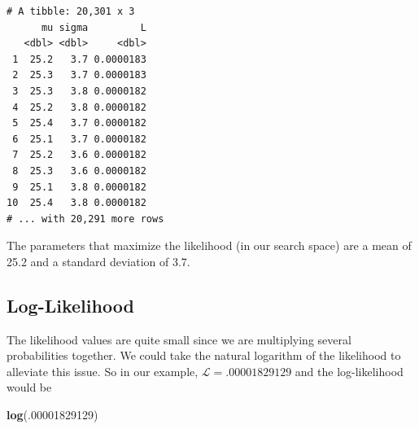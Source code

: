 \documentclass[]{book}
\newenvironment{Shaded}{\begin{snugshade}}{\end{snugshade}}
\newcommand{\DataTypeTok}[1]{\textcolor[rgb]{0.13,0.29,0.53}{#1}}
\newcommand{\DecValTok}[1]{\textcolor[rgb]{0.00,0.00,0.81}{#1}}
\newcommand{\FloatTok}[1]{\textcolor[rgb]{0.00,0.00,0.81}{#1}}
\newcommand{\KeywordTok}[1]{\textcolor[rgb]{0.13,0.29,0.53}{\textbf{#1}}}
\newcommand{\NormalTok}[1]{#1}
\newcommand{\OperatorTok}[1]{\textcolor[rgb]{0.81,0.36,0.00}{\textbf{#1}}}
\newcommand{\StringTok}[1]{\textcolor[rgb]{0.31,0.60,0.02}{#1}}
\begin{document}
\begin{Shaded}
\end{Shaded}

\begin{verbatim}
# A tibble: 20,301 x 3
      mu sigma         L
   <dbl> <dbl>     <dbl>
 1  25.2   3.7 0.0000183
 2  25.3   3.7 0.0000183
 3  25.3   3.8 0.0000182
 4  25.2   3.8 0.0000182
 5  25.4   3.7 0.0000182
 6  25.1   3.7 0.0000182
 7  25.2   3.6 0.0000182
 8  25.3   3.6 0.0000182
 9  25.1   3.8 0.0000182
10  25.4   3.8 0.0000182
# ... with 20,291 more rows
\end{verbatim}

The parameters that maximize the likelihood (in our search space) are a mean of 25.2 and a standard deviation of 3.7.

\hypertarget{log-likelihood}{%
\subsection{Log-Likelihood}\label{log-likelihood}}

The likelihood values are quite small since we are multiplying several probabilities together. We could take the natural logarithm of the likelihood to alleviate this issue. So in our example, \(\mathcal{L} = .00001829129\) and the log-likelihood would be

\begin{Shaded}
\begin{Highlighting}[]
\KeywordTok{log}\NormalTok{(.}\DecValTok{00001829129}\NormalTok{)}
\end{Highlighting}
\end{Shaded}
\end{document}
